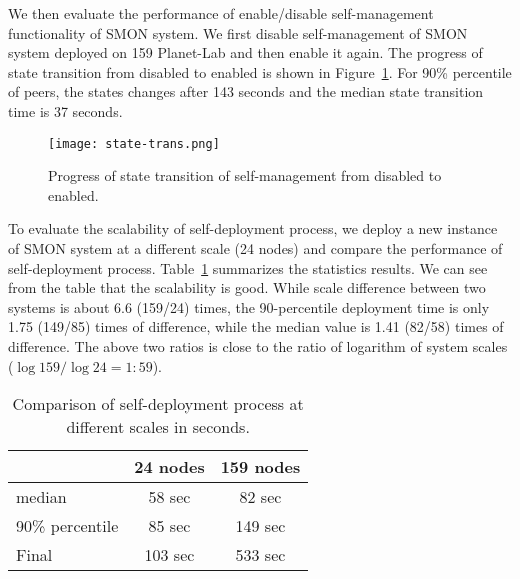 We then evaluate the performance of enable/disable
self-management functionality of SMON system. We first
disable self-management of SMON system deployed on 159
Planet-Lab and then enable it again. The progress of state
transition from disabled to enabled is shown in
Figure~\ref{fig:state-transition}. For 90\%
percentile of peers, the states changes after 143
seconds and the median state transition time is 37 seconds.

\begin{figure}
\centering
\texttt{[image: state-trans.png]}
\caption{Progress of state transition of self-management from disabled to
enabled.}
\label{fig:state-transition}
\end{figure}


To evaluate the scalability of self-deployment process, we deploy
a new instance of SMON system at a different scale (24 nodes) and
compare the performance of self-deployment process.
Table~\ref{tbl:scalability} summarizes the statistics results.
We can see from the table that the scalability is good.
While scale difference between two systems is about 6.6
(159/24) times, the
90-percentile deployment time is only 1.75 (149/85) times of
difference, while the median value is 1.41 (82/58) times of
difference. The above two ratios is close to the ratio of
logarithm of system scales ($\log 159 / \log 24 = 1:59$).

\begin{table}
\centering
\begin{tabular}{|l|c|c|}
\hline
  & 24 nodes & 159 nodes\\
\hline
median & 58 sec & 82 sec \\
\hline
90\% percentile & 85 sec & 149 sec\\
\hline
Final & 103 sec & 533 sec\\
\hline
\end{tabular}
\caption{Comparison of self-deployment process at different
scales in seconds.}
\label{tbl:scalability}
\end{table}

